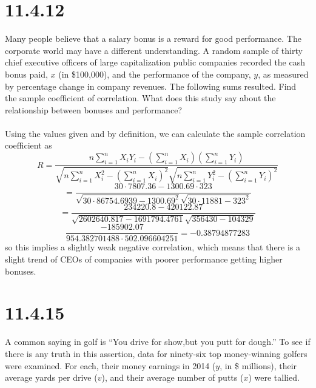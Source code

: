 \documentclass{article}
\begin{document}
{\section*{11.4.12}
Many people believe that a salary bonus is a reward for good performance. The corporate world may have a different understanding. A random sample of thirty chief executive officers of large capitalization public companies recorded the cash bonus paid, \(x\) (in \$100,000), and the performance of the company, \(y\), as measured by percentage change in company revenues. The following sums resulted. Find the sample coefficient of correlation. What does this study say about the relationship between bonuses and performance?
\\
\\
Using the values given and by definition, we can calculate the sample correlation coefficient as 
\[
R = \frac{n \sum_{i=1}^{n} X_i Y_i - (\sum_{i=1}^{n} X_i)(\sum_{i=1}^{n}Y_i)}{\sqrt{n \sum_{i=1}^{n} X_i^2 - (\sum_{i=1}^{n} X_i)^2} \sqrt{n\sum_{i=1}^{n}Y_i^2 - (\sum_{i=1}^{n} Y_i)^2}}
\]
\[
= \frac{30 \cdot 7807.36 - 1300.69 \cdot 323}{\sqrt{30 \cdot 86754.6939 - 1300.69^2}\sqrt{30 \cdot 11881 - 323^2}}
\]
\[
= \frac{234220.8 - 420122.87}{\sqrt{2602640.817 - 1691794.4761}\sqrt{356430 - 104329}}
\]
\[
\frac{-185902.07}{954.382701488 \cdot 502.096604251} = -0.38794877283
\]
so this implies a slightly weak negative correlation, which means that there is a slight trend of CEOs of companies with poorer performance getting higher bonuses. 

\section*{11.4.15}
A common saying in golf is “You drive for show,but you putt for dough.” To see if there is any truth in this assertion, data for ninety-six top money-winning golfers were examined. For each, their money earnings in 2014 (\(y\), in \$ millions), their average yards per drive (\(v\)), and their average number of putts (\(x\)) were tallied.

}
\end{document}
